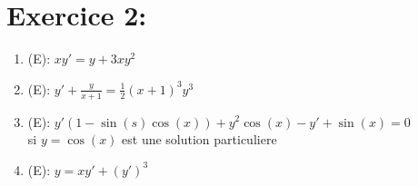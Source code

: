 \documentclass[a4paper,12pt]{article}
\begin{document}

\section*{Exercice 2:}
\begin{enumerate}
	\item (E): $xy' = y + 3xy^2$ \\
	
	
	\item (E): $y' + \frac{y}{x+1} = \frac{1}{2} (x+1)^3 y^3$ \\
	
	
	\item (E): $y' (1 -\sin(s)\cos(x)) + y^2\cos(x) -y' + \sin(x) = 0$ \\ si $y = \cos(x)$ est une solution particuliere
	
	\item (E): $y = xy' + (y')^3$
\end{enumerate}
\end{document}
